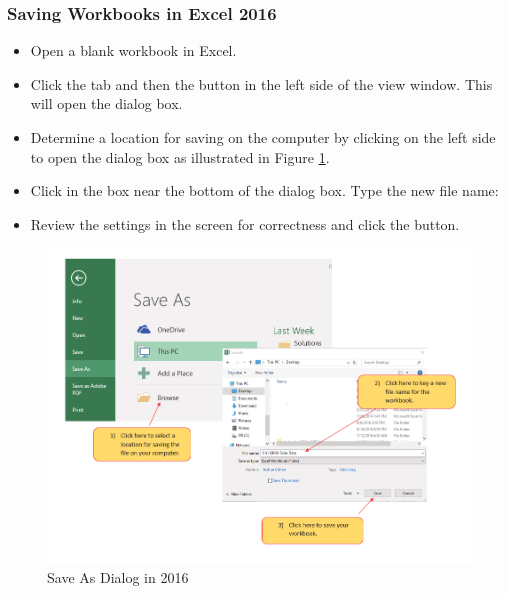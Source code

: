 \subsubsection{Saving Workbooks in Excel 2016}

\begin{itemize}
	\item Open a blank workbook in Excel.
	\item Click the  tab and then the  button in the left side of the  view window. This will open the  dialog box.
	\item Determine a location for saving on the computer by clicking  on the left side to open the  dialog box as illustrated in Figure \ref{01:fig12}.
	\item Click in the  box near the bottom of the  dialog box. Type the new file name: 
	\item Review the settings in the screen for correctness and click the  button.
\end{itemize}

\begin{figure}[H]
	\centering
	\includegraphics[width=\maxwidth{.95\linewidth}]{gfx/ch01_fig12}
	\caption{Save As Dialog in 2016}
	\label{01:fig12}
\end{figure}

